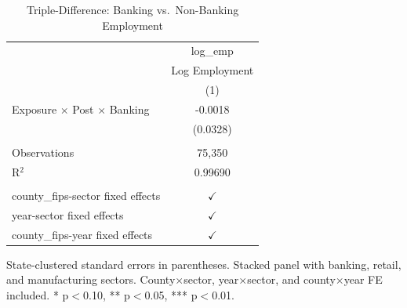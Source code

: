 
\begin{table}[htbp]
   \caption{\label{tab:ddd} Triple-Difference: Banking vs.\ Non-Banking Employment}
   \bigskip
   \centering
   \begin{tabular}{lc}
      \toprule
                                                              & log\_emp\\   
                                                              & Log Employment \\   
                                                              & (1)\\  
      \midrule 
      Exposure $\times$ Post $\times$ Banking     & -0.0018\\   
                                                              & (0.0328)\\   
       \\
      Observations                                            & 75,350\\  
      R$^2$                                                   & 0.99690\\  
       \\
      county\_fips-sector fixed effects                       & $\checkmark$\\   
      year-sector fixed effects                               & $\checkmark$\\   
      county\_fips-year fixed effects                         & $\checkmark$\\   
      \bottomrule
   \end{tabular}
   
   \par \raggedright 
   State-clustered standard errors in parentheses. Stacked panel with banking, retail, and manufacturing sectors. County$\times$sector, year$\times$sector, and county$\times$year FE included. * p$<$0.10, ** p$<$0.05, *** p$<$0.01.
\end{table}


